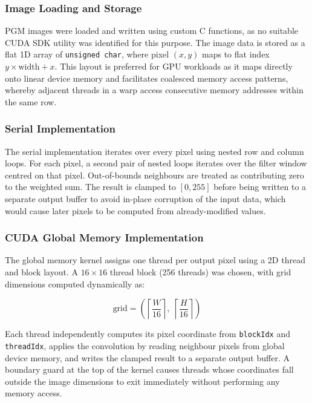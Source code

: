 \subsubsection{Image Loading and Storage}

PGM images were loaded and written using custom C functions, as no suitable CUDA SDK utility was identified for this purpose. The image data is stored as a flat 1D array of \texttt{unsigned char}, where pixel $(x, y)$ maps to flat index $y \times \text{width} + x$. This layout is preferred for GPU workloads as it maps directly onto linear device memory and facilitates coalesced memory access patterns, whereby adjacent threads in a warp access consecutive memory addresses within the same row.

\subsubsection{Serial Implementation}

The serial implementation iterates over every pixel using nested row and column loops. For each pixel, a second pair of nested loops iterates over the filter window centred on that pixel. Out-of-bounds neighbours are treated as contributing zero to the weighted sum. The result is clamped to $[0, 255]$ before being written to a separate output buffer to avoid in-place corruption of the input data, which would cause later pixels to be computed from already-modified values.

\subsubsection{CUDA Global Memory Implementation}

The global memory kernel assigns one thread per output pixel using a 2D thread and block layout. A $16 \times 16$ thread block (256 threads) was chosen, with grid dimensions computed dynamically as:

\begin{equation}
\text{grid} = \left(\left\lceil \frac{W}{16} \right\rceil,\; \left\lceil \frac{H}{16} \right\rceil\right)
\end{equation}

Each thread independently computes its pixel coordinate from \texttt{blockIdx} and \texttt{threadIdx}, applies the convolution by reading neighbour pixels from global device memory, and writes the clamped result to a separate output buffer. A boundary guard at the top of the kernel causes threads whose coordinates fall outside the image dimensions to exit immediately without performing any memory access.

